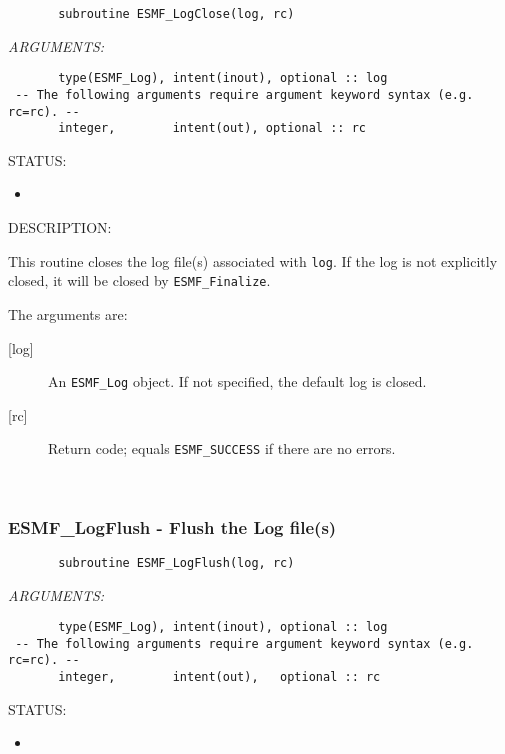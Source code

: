  
\begin{verbatim}       subroutine ESMF_LogClose(log, rc)\end{verbatim}{\em ARGUMENTS:}
\begin{verbatim}       type(ESMF_Log), intent(inout), optional :: log
 -- The following arguments require argument keyword syntax (e.g. rc=rc). --
       integer,        intent(out), optional :: rc
 \end{verbatim}
{\sf STATUS:}
   \begin{itemize}
   \item{}
   \end{itemize}
  
{\sf DESCRIPTION:\\ }


        This routine closes the log file(s) associated with {\tt log}.
        If the log is not explicitly closed, it will be closed by
        {\tt ESMF\_Finalize}.
  
        The arguments are:
        \begin{description}
  
        \item [{[log]}]
              An {\tt ESMF\_Log} object.  If not specified, the default log is closed.
        \item [{[rc]}]
              Return code; equals {\tt ESMF\_SUCCESS} if there are no errors.
        \end{description}
   
 
\mbox{}\hrulefill\ 
 
\subsubsection [ESMF\_LogFlush] {ESMF\_LogFlush - Flush the Log file(s)}


 
\begin{verbatim}       subroutine ESMF_LogFlush(log, rc)\end{verbatim}{\em ARGUMENTS:}
\begin{verbatim}       type(ESMF_Log), intent(inout), optional :: log
 -- The following arguments require argument keyword syntax (e.g. rc=rc). --
       integer,        intent(out),   optional :: rc
 \end{verbatim}
{\sf STATUS:}
   \begin{itemize}
   \item{}
   \end{itemize}
  
